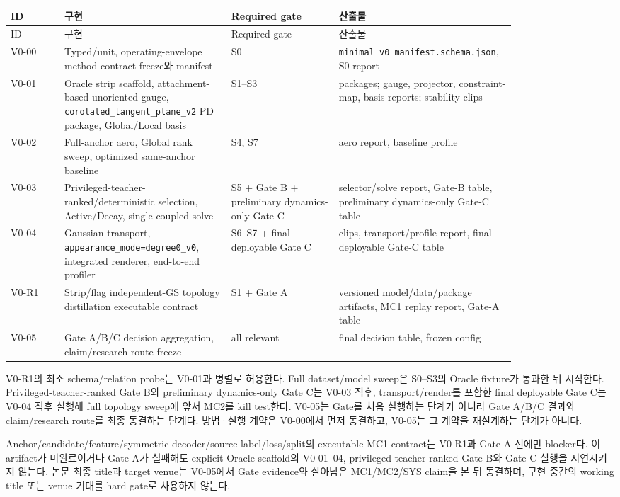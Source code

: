 \documentclass[10pt]{article}
\newcommand{\code}[1]{{\small\nolinkurl{#1}}}
\begin{document}
\begin{longtable}{L{0.10\linewidth}L{0.31\linewidth}L{0.20\linewidth}L{0.22\linewidth}}
\toprule
ID & 구현 & Required gate & 산출물\\
\midrule
\endfirsthead
\toprule
ID & 구현 & Required gate & 산출물\\
\midrule
\endhead
V0-00 & Typed/unit, operating-envelope method-contract freeze와 manifest & S0 &
{\small\nolinkurl{minimal_v0_manifest.schema.json}}, S0 report\\
V0-01 & Oracle strip scaffold, attachment-based unoriented gauge,
\code{corotated\_tangent\_plane\_v2} PD package, Global/Local basis & S1--S3 &
packages; gauge, projector, constraint-map, basis reports; stability clips\\
V0-02 & Full-anchor aero, Global rank sweep, optimized same-anchor baseline & S4, S7 & aero report, baseline profile\\
V0-03 & Privileged-teacher-ranked/deterministic selection, Active/Decay, single coupled solve &
S5 + Gate B + preliminary dynamics-only Gate C &
selector/solve report, Gate-B table, preliminary dynamics-only Gate-C table\\
V0-04 & Gaussian transport, \code{appearance\_mode=degree0\_v0}, integrated renderer,
end-to-end profiler &
S6--S7 + final deployable Gate C &
clips, transport/profile report, final deployable Gate-C table\\
V0-R1 & Strip/flag independent-GS topology distillation executable contract & S1 + Gate A &
versioned model/data/package artifacts, MC1 replay report, Gate-A table\\
V0-05 & Gate A/B/C decision aggregation, claim/research-route freeze & all relevant &
final decision table, frozen config\\
\bottomrule
\end{longtable}

V0-R1의 최소 schema/relation probe는 V0-01과 병렬로 허용한다.
Full dataset/model sweep은 S0--S3의 Oracle fixture가 통과한 뒤 시작한다.
Privileged-teacher-ranked Gate B와 preliminary dynamics-only Gate C는 V0-03 직후,
transport/render를 포함한 final deployable Gate C는 V0-04 직후 실행해
full topology sweep에 앞서 MC2를 kill test한다. V0-05는 Gate를 처음 실행하는
단계가 아니라 Gate A/B/C 결과와 claim/research route를 최종 동결하는
단계다. 방법·실행 계약은 V0-00에서 먼저 동결하고,
V0-05는 그 계약을 재설계하는 단계가 아니다.

Anchor/candidate/feature/symmetric decoder/source-label/loss/split의 executable MC1 contract는
V0-R1과 Gate A 전에만 blocker다. 이 artifact가 미완료이거나 Gate A가 실패해도
explicit Oracle scaffold의 V0-01--04, privileged-teacher-ranked Gate B와 Gate C 실행을 지연시키지 않는다.
논문 최종 title과 target venue는 V0-05에서 Gate evidence와 살아남은 MC1/MC2/SYS claim을 본 뒤
동결하며, 구현 중간의 working title 또는 venue 기대를 hard gate로 사용하지 않는다.
\end{document}
